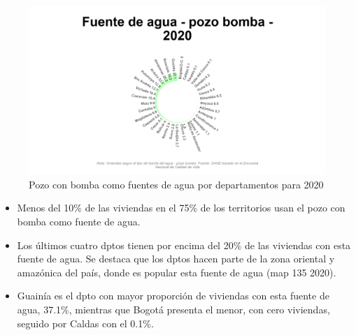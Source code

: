     \begin{figure}[H]
        \caption{Pozo con bomba como fuentes de agua por departamentos para 2020 \label{map_result_2} }
        \begin{center}
        \includegraphics[width=\textwidth,keepaspectratio]{img/var_135_static.png}
        \end{center}
    \end{figure}
            \begin{itemize}
                    \item Menos del 10\% de las viviendas en el 75\% de los territorios usan el pozo con bomba como fuente de agua.
                    \item Los últimos cuatro dptos tienen por encima del 20\% de las viviendas con esta fuente de agua. Se destaca que los dptos hacen parte de la zona oriental y amazónica del país, donde es popular esta fuente de agua (map 135 2020).
                    \item Guainía es el dpto con mayor proporción de viviendas con esta fuente de agua, 37.1\%, mientras que Bogotá presenta el menor, con cero viviendas, seguido por Caldas con el 0.1\%.
                    \end{itemize}

